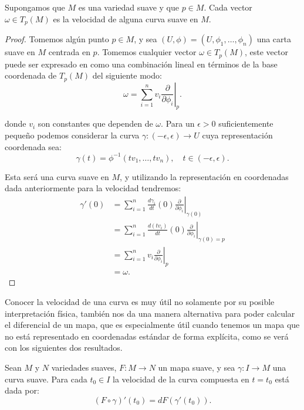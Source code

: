 \begin{theorem}
	Supongamos que $M$ es una variedad suave y que $p \in M$. Cada vector $\omega \in T_p(M)$ es la velocidad de alguna curva suave en $M$.
\end{theorem}

\begin{proof}
	Tomemos algún punto $p \in M$, y sea $(U,\phi) = (U,\phi_1, \dots, \phi_n)$ una carta suave en $M$ centrada en $p$. Tomemos cualquier vector $\omega \in T_p(M)$, este vector puede ser expresado en como una combinación lineal en términos de la base coordenada de $T_p(M)$ del siguiente modo:
	\[
		\omega = \sum_{i=1}^{n} v_i \left.\frac{\partial}{\partial \phi_i}\right|_{p}.
	\]

	donde $v_i$ son constantes que dependen de $\omega$. Para un $\epsilon > 0$ suficientemente pequeño podemos considerar la curva $\gamma: (-\epsilon, \epsilon) \to U$ cuya representación coordenada sea:
	\[
		\gamma(t) = \phi^{-1}(tv_1, \dots, tv_n), \quad t \in (-\epsilon,\epsilon).
	\]

	Esta será una curva suave en $M$, y utilizando la representación en coordenadas dada anteriormente para la velocidad tendremos:
	\begin{align*}
		\gamma'(0) & = \sum_{i=1}^{n} \frac{d\gamma_i}{dt}(0)
		\left.  \frac{\partial}{\partial \phi_i}\right|_{\gamma(0)}                         \\
		           & = \sum_{i=1}^{n} \frac{d (tv_i)}{dt}(0)
		\left. \frac{\partial}{\partial \phi_i} \right|_{\gamma(0)= p}                      \\
		           & = \sum_{i=1}^{n} v_i \left. \frac{\partial}{\partial \phi_i} \right|_p \\
		           & = \omega.
	\end{align*}
\end{proof}

Conocer la velocidad de una curva es muy útil no solamente por su posible interpretación física, también nos da una manera alternativa para poder calcular el diferencial de un mapa, que es especialmente útil cuando tenemos un mapa que no está representado en coordenadas estándar de forma explícita, como se verá con los siguientes dos resultados.

\begin{lemma}
	Sean $M$ y $N$ variedades suaves, $F: M \to N$ un mapa suave, y sea $\gamma: I \to M$ una curva suave. Para cada $t_0 \in I$ la velocidad de la curva compuesta en $t=t_0$ está dada por:
	\[ (F \circ \gamma)'(t_0) = dF(\gamma'(t_0)). \]
\end{lemma}

